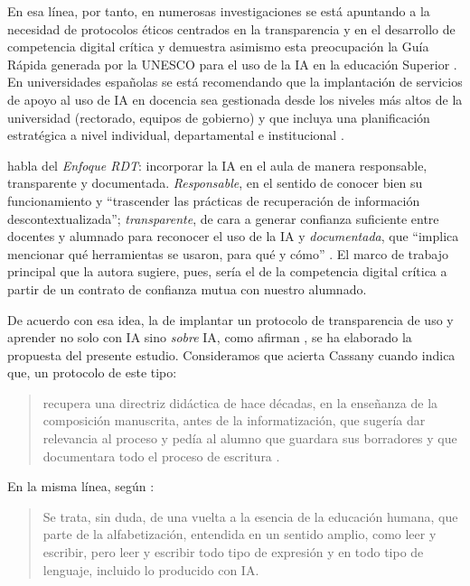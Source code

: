 \documentclass[spanish]{textolivre}
\begin{document}
En esa línea, por tanto, en numerosas investigaciones se está apuntando a la necesidad de protocolos éticos centrados en la transparencia y en el desarrollo de competencia digital crítica \cite{AlZahrani2024,Castaneda2019,CuestaGarciaGonzalezArguelloPujola2024,MagroLara2025} y demuestra asimismo esta preocupación la Guía Rápida generada por la UNESCO para el uso de la IA en la educación Superior \cite{SabzalievaValentini2023,MartinezGonzalez2023,MiguezGordillo2025}. En universidades españolas se está recomendando que la implantación de servicios de apoyo al uso de IA en docencia sea gestionada desde los niveles más altos de la universidad (rectorado, equipos de gobierno) y que incluya una planificación estratégica a nivel individual, departamental e institucional \cite{CordonGarcia2023}.

\textcite{Ferrarelli2024} habla del \textit{Enfoque RDT}: incorporar la IA en el aula de manera responsable, transparente y documentada. \textit{Responsable}, en el sentido de conocer bien su funcionamiento y “trascender las prácticas de recuperación de información descontextualizada”; \textit{transparente}, de cara a generar confianza suficiente entre docentes y alumnado para reconocer el uso de la IA y \textit{documentada}, que “implica mencionar qué herramientas se usaron, para qué y cómo” \cite[p. 17]{Ferrarelli2024}. El marco de trabajo principal que la autora sugiere, pues, sería el de la competencia digital crítica a partir de un contrato de confianza mutua con nuestro alumnado.

De acuerdo con esa idea, la de implantar un protocolo de transparencia de uso y aprender no solo con IA sino \textit{sobre} IA, como afirman \textcite{MagroLara2025}, se ha elaborado la propuesta del presente estudio. Consideramos que acierta Cassany cuando indica que, un protocolo de este tipo:

\begin{quote}
    recupera una directriz didáctica de hace décadas, en la enseñanza de la composición manuscrita, antes de la informatización, que sugería dar relevancia al proceso y pedía al alumno que guardara sus borradores y que documentara todo el proceso de escritura \cite[p. 332]{Cassany2024}.
\end{quote}

En la misma línea, según \textcite[p. 115]{MagroLara2025}:

\begin{quote}
    Se trata, sin duda, de una vuelta a la esencia de la educación humana, que parte de la alfabetización, entendida en un sentido amplio, como leer y escribir, pero leer y escribir todo tipo de expresión y en todo tipo de lenguaje, incluido lo producido con IA.
\end{quote}
\end{document}
